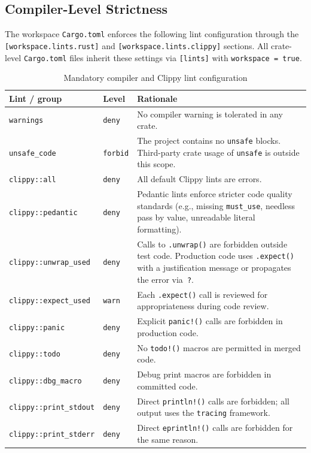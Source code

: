 \documentclass[a4paper, 11pt, oneside]{report}
\begin{document}
\subsection{Compiler-Level Strictness}
\label{sec:compiler-strictness}

The workspace \texttt{Cargo.toml} enforces the following lint
configuration through the \texttt{[workspace\-.lints\-.rust]}
and \texttt{[workspace\-.lints\-.clippy]} sections.
All crate-level \texttt{Cargo.toml} files inherit these settings
via \texttt{[lints]} with \texttt{workspace\,=\,true}.

\begin{table}[H]
  \centering
  \caption{Mandatory compiler and Clippy lint configuration}
  \label{tab:lint-config}
  \begin{tabularx}{\textwidth}{l l X}
    \toprule
    \textbf{Lint / group} & \textbf{Level} & \textbf{Rationale} \\
    \midrule
    \texttt{warnings}                        & \texttt{deny}  &
      No compiler warning is tolerated in any crate. \\
    \texttt{unsafe\_code}                    & \texttt{forbid} &
      The project contains no \texttt{unsafe} blocks.
      Third-party crate usage of \texttt{unsafe} is outside this
      scope. \\
    \texttt{clippy::all}                     & \texttt{deny}  &
      All default Clippy lints are errors. \\
    \texttt{clippy::pedantic}                & \texttt{deny}  &
      Pedantic lints enforce stricter code quality standards
      (e.g., missing \texttt{must\_use}, needless pass by value,
      unreadable literal formatting). \\
    \texttt{clippy::unwrap\_used}            & \texttt{deny}  &
      Calls to \texttt{.unwrap()} are forbidden outside test code.
      Production code uses \texttt{.expect()} with a justification
      message or propagates the error via~\texttt{?}. \\
    \texttt{clippy::expect\_used}            & \texttt{warn}  &
      Each \texttt{.expect()} call is reviewed for appropriateness
      during code review. \\
    \texttt{clippy::panic}                   & \texttt{deny}  &
      Explicit \texttt{panic!()} calls are forbidden in production
      code. \\
    \texttt{clippy::todo}                    & \texttt{deny}  &
      No \texttt{todo!()} macros are permitted in merged code. \\
    \texttt{clippy::dbg\_macro}              & \texttt{deny}  &
      Debug print macros are forbidden in committed code. \\
    \texttt{clippy::print\_stdout}           & \texttt{deny}  &
      Direct \texttt{println!()} calls are forbidden; all output
      uses the \texttt{tracing} framework. \\
    \texttt{clippy::print\_stderr}           & \texttt{deny}  &
      Direct \texttt{eprintln!()} calls are forbidden for the
      same reason. \\
    \bottomrule
  \end{tabularx}
\end{table}
\end{document}
